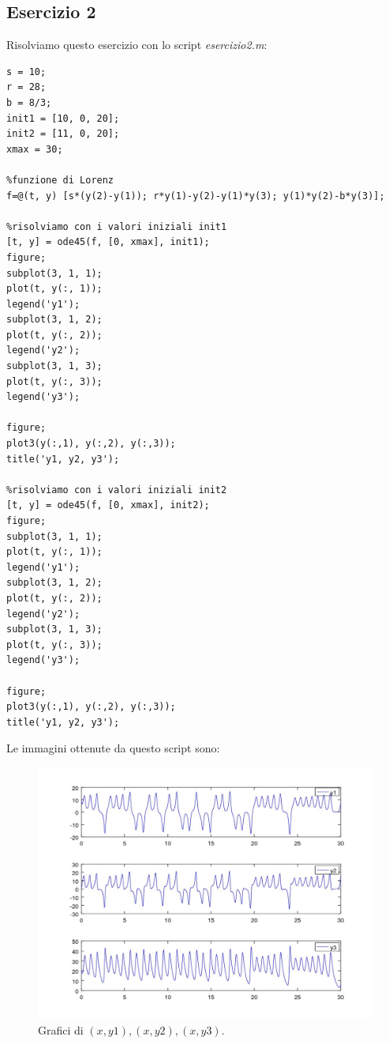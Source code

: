 \documentclass[11pt,a4paper,twoside,openright,titlepage,
headinclude,footinclude,BCOR5mm,
numbers=noenddot,cleardoublepage=empty,
tablecaptionabove]{scrbook}
\begin{document}
\subsection{Esercizio 2}
Risolviamo questo esercizio con lo script \emph{esercizio2.m}:
\begin{lstlisting}[frame = trBL]
s = 10;
r = 28;
b = 8/3;
init1 = [10, 0, 20];
init2 = [11, 0, 20];
xmax = 30;

%funzione di Lorenz
f=@(t, y) [s*(y(2)-y(1)); r*y(1)-y(2)-y(1)*y(3); y(1)*y(2)-b*y(3)];

%risolviamo con i valori iniziali init1
[t, y] = ode45(f, [0, xmax], init1);
figure;
subplot(3, 1, 1);
plot(t, y(:, 1));
legend('y1');
subplot(3, 1, 2);
plot(t, y(:, 2));
legend('y2');
subplot(3, 1, 3);
plot(t, y(:, 3));
legend('y3');

figure;
plot3(y(:,1), y(:,2), y(:,3));
title('y1, y2, y3');

%risolviamo con i valori iniziali init2
[t, y] = ode45(f, [0, xmax], init2);
figure;
subplot(3, 1, 1);
plot(t, y(:, 1));
legend('y1');
subplot(3, 1, 2);
plot(t, y(:, 2));
legend('y2');
subplot(3, 1, 3);
plot(t, y(:, 3));
legend('y3');

figure;
plot3(y(:,1), y(:,2), y(:,3));
title('y1, y2, y3');
\end{lstlisting}
Le immagini ottenute da questo script sono:
\begin{center}
\begin{figure}[h!]
\includegraphics[width=\textwidth]{figs/esercizio2_1.jpg}
\caption{Grafici di $(x, y1), (x, y2), (x, y3)$.}
\end{figure}
\end{center}
\end{document}
